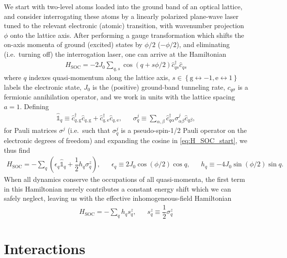 \documentclass[aps,notitlepage,nofootinbib,11pt]{revtex4-1}
\renewcommand{\t}{\text} %
\newcommand{\f}[2]{\dfrac{#1}{#2}} %
\newcommand{\p}[1]{\left(#1\right)} %
\renewcommand{\set}[1]{\left\{#1\right\}} %
\newcommand{\g}{\text{g}} %
\newcommand{\e}{\text{e}}
\newcommand{\1}{\hat{\mathds{1}}}
\begin{document}
We start with two-level atoms loaded into the ground band of an
optical lattice, and consider interrogating these atoms by a linearly
polarized plane-wave laser tuned to the relevant electronic (atomic)
transition, with wavenumber projection $\phi$ onto the lattice axis.
After performing a gauge transformation which shifts the on-axis
momenta of ground (excited) states by $\phi/2$ ($-\phi/2$), and
eliminating (i.e.~turning off) the interrogation laser, one can arrive
at the Hamiltonian
\begin{align}
  H_{\t{SOC}}
  = -2J_0\sum_{q,s} \cos\p{q+s\phi/2} \hat c_{qs}^\dag \hat c_{qs}
  \label{eq:H_SOC_start}
\end{align}
where $q$ indexes quasi-momentum along the lattice axis,
$s\in\set{\g\leftrightarrow-1,\e\leftrightarrow1}$ labels the
electronic state, $J_0$ is the (positive) ground-band tunneling rate,
$c_{q\sigma}$ is a fermionic annihilation operator, and we work in
units with the lattice spacing $a=1$.  Defining
\begin{align}
  \1_q \equiv \hat c_{q,\g}^\dag \hat c_{q,\g}
  + \hat c_{q,\e}^\dag \hat c_{q,\e},
  &&
  \sigma_q^j \equiv \sum_{\alpha,\beta}
  \hat c_{q\alpha}^\dag \sigma^j_{\alpha\beta} \hat c_{q\beta},
  \label{eq:pseudospin}
\end{align}
for Pauli matrices $\sigma^j$ (i.e.~such that $\sigma_q^j$ is a
pseudo-spin-1/2 Pauli operator on the electronic degrees of freedom)
and expanding the cosine in \eqref{eq:H_SOC_start}, we thus find
\begin{align}
  H_{\t{SOC}}
  = -\sum_q \p{\epsilon_q \1_q + \f12 h_q \sigma_q^z},
  &&
  \epsilon_q \equiv 2J_0 \cos\p{\phi/2} \cos q,
  &&
  h_q \equiv -4J_0 \sin\p{\phi/2} \sin q.
\end{align}
When all dynamics conserve the occupations of all quasi-momenta, the
first term in this Hamiltonian merely contributes a constant energy
shift which we can safely neglect, leaving us with the effective
inhomogeneous-field Hamiltonian
\begin{align}
  H_{\t{SOC}} = -\sum_q h_q s_q^z,
  &&
  s_q^z \equiv \f12 \sigma_q^z
  \label{eq:H_SOC}
\end{align}


\section{Interactions}
\end{document}
